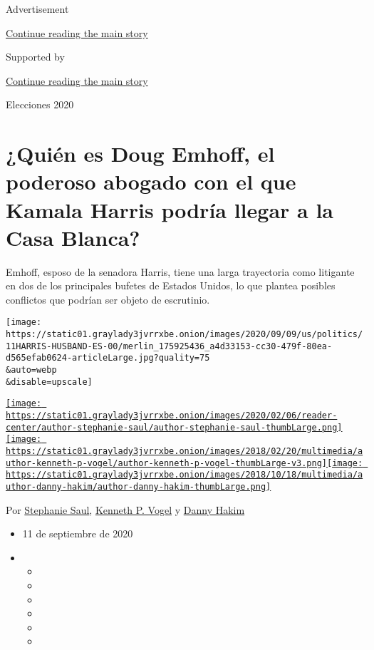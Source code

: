 Advertisement

\protect\hyperlink{after-top}{Continue reading the main story}

Supported by

\protect\hyperlink{after-sponsor}{Continue reading the main story}

Elecciones 2020

\hypertarget{quiuxe9n-es-doug-emhoff-el-poderoso-abogado-con-el-que-kamala-harris-podruxeda-llegar-a-la-casa-blanca}{%
\section{¿Quién es Doug Emhoff, el poderoso abogado con el que Kamala
Harris podría llegar a la Casa
Blanca?}\label{quiuxe9n-es-doug-emhoff-el-poderoso-abogado-con-el-que-kamala-harris-podruxeda-llegar-a-la-casa-blanca}}

Emhoff, esposo de la senadora Harris, tiene una larga trayectoria como
litigante en dos de los principales bufetes de Estados Unidos, lo que
plantea posibles conflictos que podrían ser objeto de escrutinio.

\texttt{[image: https://static01.graylady3jvrrxbe.onion/images/2020/09/09/us/politics/11HARRIS-HUSBAND-ES-00/merlin\_175925436\_a4d33153-cc30-479f-80ea-d565efab0624-articleLarge.jpg?quality=75\\\&auto=webp\\\&disable=upscale]}

\href{https://www.nytimes3xbfgragh.onion/by/stephanie-saul}{\texttt{[image: https://static01.graylady3jvrrxbe.onion/images/2020/02/06/reader-center/author-stephanie-saul/author-stephanie-saul-thumbLarge.png]}}\href{https://www.nytimes3xbfgragh.onion/by/kenneth-p-vogel}{\texttt{[image: https://static01.graylady3jvrrxbe.onion/images/2018/02/20/multimedia/author-kenneth-p-vogel/author-kenneth-p-vogel-thumbLarge-v3.png]}}\href{https://www.nytimes3xbfgragh.onion/by/danny-hakim}{\texttt{[image: https://static01.graylady3jvrrxbe.onion/images/2018/10/18/multimedia/author-danny-hakim/author-danny-hakim-thumbLarge.png]}}

Por
\href{https://www.nytimes3xbfgragh.onion/by/stephanie-saul}{Stephanie
Saul},
\href{https://www.nytimes3xbfgragh.onion/by/kenneth-p-vogel}{Kenneth P.
Vogel} y \href{https://www.nytimes3xbfgragh.onion/by/danny-hakim}{Danny
Hakim}

\begin{itemize}
\item
  11 de septiembre de 2020
\item
  \begin{itemize}
  \item
  \item
  \item
  \item
  \item
  \item
  \end{itemize}
\end{itemize}

